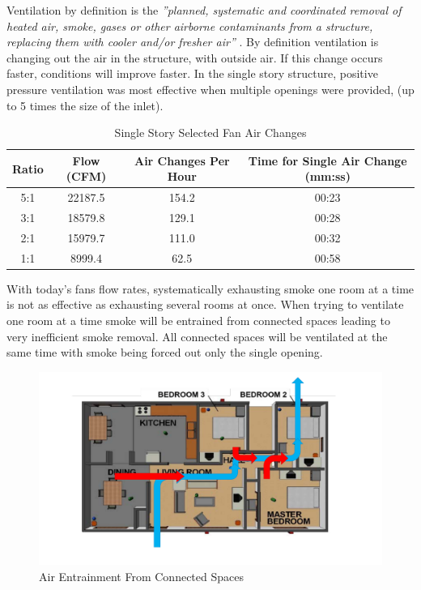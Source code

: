 \documentclass{article}
\begin{document}
Ventilation by definition is the \textit{''planned, systematic and coordinated removal of heated air, smoke, gases or other airborne contaminants from a structure, replacing them with cooler and/or fresher air''} \cite{Essentials6}. By definition ventilation is changing out the air in the structure, with outside air. If this change occurs faster, conditions will improve faster. In the single story structure, positive pressure ventilation was most effective when multiple openings were provided, (up to 5 times the size of the inlet). 

\begin{table}[H]
	\centering
	\caption{Single Story Selected Fan Air Changes}
	\begin{tabular}{|c|c|c|c|}
		\hline
		Ratio & Flow (CFM) & Air Changes Per Hour & Time for Single Air Change (mm:ss) \\ \hline \hline
		5:1 & 22187.5 & 154.2 & 00:23 \\ \hline
		3:1 & 18579.8 & 129.1 & 00:28 \\ \hline
		2:1 & 15979.7 & 111.0 & 00:32 \\ \hline
		1:1 & 8999.4 & 62.5 & 00:58 \\ \hline
	\end{tabular}
	\label{tab:SingleStoryAirChanges}
\end{table}

With today’s fans flow rates, systematically exhausting smoke one room at a time is not as effective as exhausting several rooms at once.  When trying to ventilate one room at a time smoke will be entrained from connected spaces leading to very inefficient smoke removal.  All connected spaces will be ventilated at the same time with smoke being forced out only the single opening.

\begin{figure} [H]
	\centering
	\includegraphics[width = 5in]{0_Images/Tactical_Considerations/Systematic_Vs_Non-Systematic/EntrainedAir.pdf}
	\caption{Air Entrainment From Connected Spaces}
\end{figure}
\end{document}
